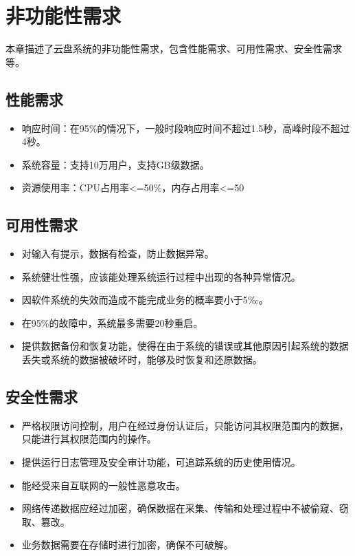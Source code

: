 \section{非功能性需求}

本章描述了云盘系统的非功能性需求，包含性能需求、可用性需求、安全性需求等。

\subsection{性能需求}

\begin{itemize}
\item 响应时间：在95\%的情况下，一般时段响应时间不超过1.5秒，高峰时段不超过4秒。
\item 系统容量：支持10万用户，支持GB级数据。
\item 资源使用率：CPU占用率<=50\%，内存占用率<=50%
\end{itemize}

\subsection{可用性需求}

\begin{itemize}
\item 对输入有提示，数据有检查，防止数据异常。
\item 系统健壮性强，应该能处理系统运行过程中出现的各种异常情况。
\item 因软件系统的失效而造成不能完成业务的概率要小于5‰。
\item 在95\%的故障中，系统最多需要20秒重启。
\item 提供数据备份和恢复功能，使得在由于系统的错误或其他原因引起系统的数据丢失或系统的数据被破坏时，能够及时恢复和还原数据。
\end{itemize}

\subsection{安全性需求}

\begin{itemize}
\item 严格权限访问控制，用户在经过身份认证后，只能访问其权限范围内的数据，只能进行其权限范围内的操作。
\item 提供运行日志管理及安全审计功能，可追踪系统的历史使用情况。
\item 能经受来自互联网的一般性恶意攻击。
\item 网络传递数据应经过加密，确保数据在采集、传输和处理过程中不被偷窥、窃取、篡改。
\item 业务数据需要在存储时进行加密，确保不可破解。
\end{itemize}
